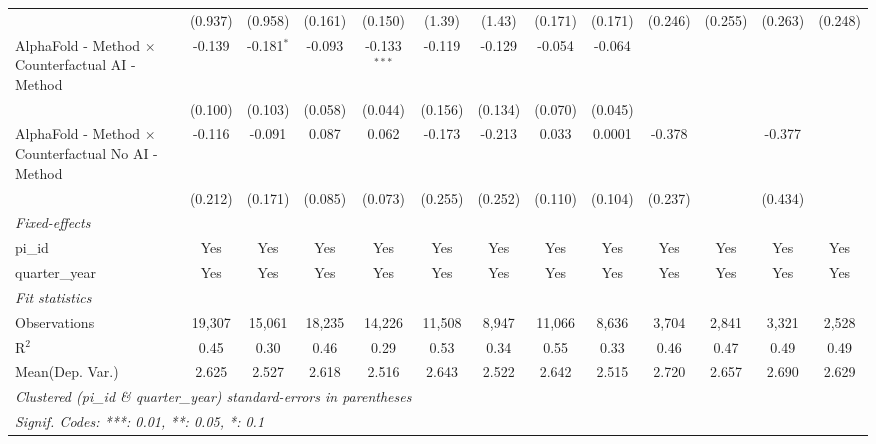 \begin{tabular}{lcccccccccccc}
                                                              & (0.937)      & (0.958)      & (0.161)      & (0.150)        & (1.39)       & (1.43)  & (0.171)      & (0.171)     & (0.246) & (0.255)      & (0.263)      & (0.248)\\   
   AlphaFold - Method $\times$ Counterfactual AI - Method     & -0.139       & -0.181$^{*}$ & -0.093       & -0.133$^{***}$ & -0.119       & -0.129  & -0.054       & -0.064      &         &              &              &   \\   
                                                              & (0.100)      & (0.103)      & (0.058)      & (0.044)        & (0.156)      & (0.134) & (0.070)      & (0.045)     &         &              &              &   \\   
   AlphaFold - Method $\times$ Counterfactual No AI - Method  & -0.116       & -0.091       & 0.087        & 0.062          & -0.173       & -0.213  & 0.033        & 0.0001      & -0.378  &              & -0.377       &   \\   
                                                              & (0.212)      & (0.171)      & (0.085)      & (0.073)        & (0.255)      & (0.252) & (0.110)      & (0.104)     & (0.237) &              & (0.434)      &   \\   
   \midrule
   \emph{Fixed-effects}\\
   pi\_id                                                     & Yes          & Yes          & Yes          & Yes            & Yes          & Yes     & Yes          & Yes         & Yes     & Yes          & Yes          & Yes\\  
   quarter\_year                                              & Yes          & Yes          & Yes          & Yes            & Yes          & Yes     & Yes          & Yes         & Yes     & Yes          & Yes          & Yes\\  
   \midrule
   \emph{Fit statistics}\\
   Observations                                               & 19,307       & 15,061       & 18,235       & 14,226         & 11,508       & 8,947   & 11,066       & 8,636       & 3,704   & 2,841        & 3,321        & 2,528\\  
   R$^2$                                                      & 0.45         & 0.30         & 0.46         & 0.29           & 0.53         & 0.34    & 0.55         & 0.33        & 0.46    & 0.47         & 0.49         & 0.49\\  
Mean(Dep. Var.) & 2.625 & 2.527 & 2.618 & 2.516 & 2.643 & 2.522 & 2.642 & 2.515 & 2.720 & 2.657 & 2.690 & 2.629 \\
   \midrule \midrule
   \multicolumn{13}{l}{\emph{Clustered (pi\_id \& quarter\_year) standard-errors in parentheses}}\\
   \multicolumn{13}{l}{\emph{Signif. Codes: ***: 0.01, **: 0.05, *: 0.1}}\\
\end{tabular}
\par\endgroup

